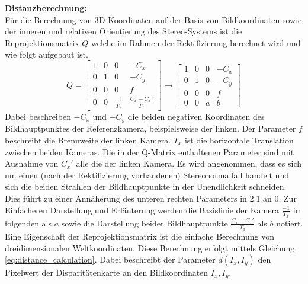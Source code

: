 \noindent
\textbf{Distanzberechnung:}\\
Für die Berechnung von 3D-Koordinaten auf der Basis von Bildkoordinaten sowie der inneren und relativen Orientierung des Stereo-Systems ist die Reprojektionsmatrix $Q$ welche im Rahmen der Rektifizierung berechnet wird und wie folgt aufgebaut ist.
\begin{equation}
    Q= 
    \begin{bmatrix}
      1 & 0 & 0 & -C_x\\
      0 & 1 & 0 & -C_y\\
      0 & 0 & 0 & f\\
      0 & 0 & \frac{-1}{T_x} & \frac{C_x - C_x'}{T_x}
    \end{bmatrix}
    \longrightarrow
    \begin{bmatrix}
      1 & 0 & 0 & -C_x\\
      0 & 1 & 0 & -C_y\\
      0 & 0 & 0 & f\\
      0 & 0 & a & b
    \end{bmatrix}
\end{equation}
Dabei beschreiben $-C_x$ und $-C_y$ die beiden negativen Koordinaten des Bildhauptpunktes der Referenzkamera, beispielsweise der linken. Der Parameter $f$ beschreibt die Brennweite der linken Kamera. $T_x$ ist die horizontale Translation zwischen beiden Kameras. Die in der Q-Matrix enthaltenen Parameter sind mit Ausnahme von $C_x'$ alle die der linken Kamera. Es wird angenommen, dass es sich um einen (nach der Rektifizierung vorhandenen) Stereonormalfall handelt und sich die beiden Strahlen der Bildhauptpunkte in der Unendlichkeit schneiden. Dies führt zu einer Annäherung des unteren rechten Parameters in 2.1 an $0$. Zur Einfacheren Darstellung und Erläuterung werden die Basislinie der Kamera $\frac{-1}{T_x}$ im folgenden als $a$ sowie die Darstellung beider Bildhauptpunkte $\frac{C_x - C_x'}{T_x}$ als $b$ notiert.\\

\noindent
Eine Eigenschaft der Reprojektionsmatrix ist die einfache Berechnung von dreidimensionalen Weltkoordinaten. Diese Berechnung erfolgt mittels Gleichung \ref{eq:distance_calculation}. Dabei beschreibt der Parameter $d(I_x,I_y)$ den Pixelwert der Disparitätenkarte an den Bildkoordinaten $I_x,I_y$.

